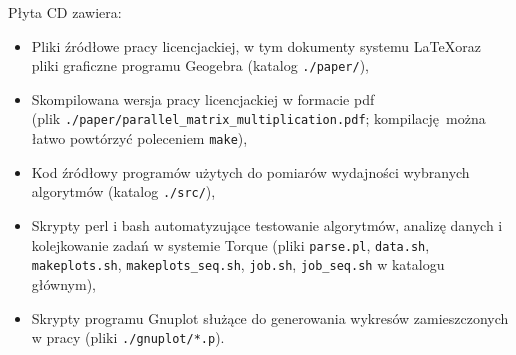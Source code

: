 Płyta CD zawiera:
\begin{itemize}
\item Pliki źródłowe pracy licencjackiej, w tym dokumenty systemu \LaTeX  oraz pliki graficzne programu Geogebra (katalog \texttt{./paper/}),
\item Skompilowana wersja pracy licencjackiej w formacie pdf\\(plik \texttt{./paper/parallel\_matrix\_multiplication.pdf}; kompilację można łatwo powtórzyć poleceniem \texttt{make}),
\item Kod źródłowy programów użytych do pomiarów wydajności wybranych algorytmów (katalog \texttt{./src/}),
\item Skrypty perl i bash automatyzujące testowanie algorytmów, analizę danych i kolejkowanie zadań w systemie Torque (pliki \texttt{parse.pl}, \texttt{data.sh}, \texttt{makeplots.sh}, \texttt{makeplots\_seq.sh}, \texttt{job.sh}, \texttt{job\_seq.sh} w katalogu głównym),
\item Skrypty programu Gnuplot służące do generowania wykresów zamieszczonych w pracy (pliki \texttt{./gnuplot/*.p}).
\end{itemize}